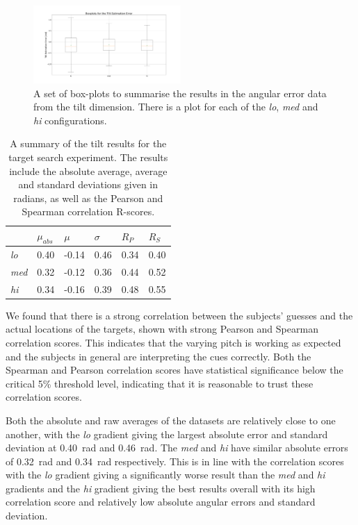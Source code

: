 \documentclass[format=sigconf, review=true, screen=true, anonymous=true]{acmart}
\begin{document}
\begin{figure}
  \centering
  \includegraphics[width=0.5\textwidth]{figures/tilt_err_boxplot.png}
  \caption{A set of box-plots to summarise the results in the angular error data from the tilt dimension. There is a plot for each of the \emph{lo}, \emph{med} and \emph{hi} configurations. }
  \label{fig:tilt-boxplots}
\end{figure}

\begin{table}
  \centering
  \caption{A summary of the tilt results for the target search experiment. The results include the absolute average, average and standard deviations given in radians, as well as the Pearson and Spearman correlation R-scores.}
  \label{tab:tilt-results}
  \begin{tabular}{|l|l|l|l|l|l|}
    \hline
    & $\mu_{abs}$ & $\mu$ & $\sigma$ & $R_{P}$ & $R_{S}$ \\\hline\hline
    \emph{lo}  & 0.40 & -0.14 & 0.46 & 0.34 & 0.40 \\\hline
    \emph{med} & 0.32 & -0.12 & 0.36 & 0.44 & 0.52 \\\hline
    \emph{hi}  & 0.34 & -0.16 & 0.39 & 0.48 & 0.55 \\\hline
  \end{tabular}
\end{table}

We found that there is a strong correlation between the subjects' guesses and the actual locations of the targets, shown with strong Pearson and Spearman correlation scores. This indicates that the varying pitch is working as expected and the subjects in general are interpreting the cues correctly. Both the Spearman and Pearson correlation scores have statistical significance below the critical 5\% threshold level, indicating that it is reasonable to trust these correlation scores. 

Both the absolute and raw averages of the datasets are relatively close to one another, with the \emph{lo} gradient giving the largest absolute error and standard deviation at \SI{0.40}{\radian} and \SI{0.46}{\radian}. The \emph{med} and \emph{hi} have similar absolute errors of \SI{0.32}{\radian} and \SI{0.34}{\radian} respectively. This is in line with the correlation scores with the \emph{lo} gradient giving a significantly worse result than the \emph{med} and \emph{hi} gradients and the \emph{hi} gradient giving the best results overall with its high correlation score and relatively low absolute angular errors and standard deviation. 
\end{document}
